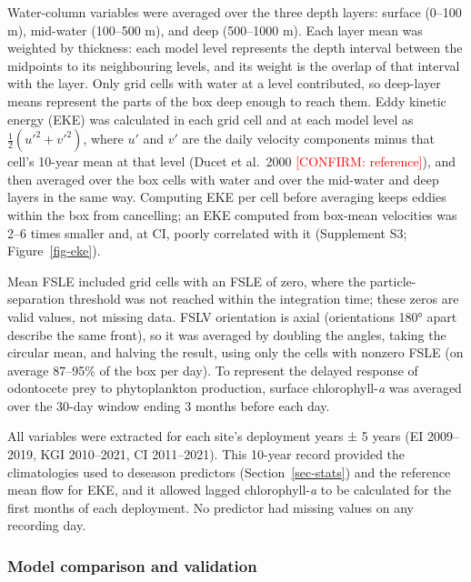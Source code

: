 \documentclass[
  11pt,
]{article}
\newcommand{\conf}[1]{\textcolor{red}{[CONFIRM: #1]}}
\begin{document}
Water-column variables were averaged over the three depth layers:
surface (0--100 m), mid-water (100--500 m), and deep (500--1000 m). Each
layer mean was weighted by thickness: each model level represents the
depth interval between the midpoints to its neighbouring levels, and its
weight is the overlap of that interval with the layer. Only grid cells
with water at a level contributed, so deep-layer means represent the
parts of the box deep enough to reach them. Eddy kinetic energy (EKE)
was calculated in each grid cell and at each model level as
\(\frac{1}{2}(u'^2 + v'^2)\), where \(u'\) and \(v'\) are the daily
velocity components minus that cell's 10-year mean at that level (Ducet
et al.~2000 \conf{reference}), and then averaged over the box cells with
water and over the mid-water and deep layers in the same way. Computing
EKE per cell before averaging keeps eddies within the box from
cancelling; an EKE computed from box-mean velocities was 2--6 times
smaller and, at CI, poorly correlated with it (Supplement S3;
Figure~\ref{fig-eke}).

Mean FSLE included grid cells with an FSLE of zero, where the
particle-separation threshold was not reached within the integration
time; these zeros are valid values, not missing data. FSLV orientation
is axial (orientations 180° apart describe the same front), so it was
averaged by doubling the angles, taking the circular mean, and halving
the result, using only the cells with nonzero FSLE (on average 87--95\%
of the box per day). To represent the delayed response of odontocete
prey to phytoplankton production, surface chlorophyll-\emph{a} was
averaged over the 30-day window ending 3 months before each day.

All variables were extracted for each site's deployment years ± 5 years
(EI 2009--2019, KGI 2010--2021, CI 2011--2021). This 10-year record
provided the climatologies used to deseason predictors
(Section~\ref{sec-stats}) and the reference mean flow for EKE, and it
allowed lagged chlorophyll-\emph{a} to be calculated for the first
months of each deployment. No predictor had missing values on any
recording day.

\subsubsection{Model comparison and validation}\label{sec-valid}
\end{document}

